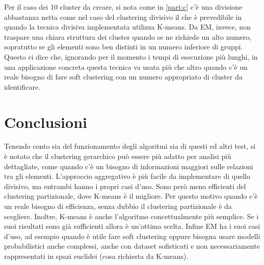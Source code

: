 \documentclass{llncs}
\begin{document}
	Per il caso dei 10 cluster da creare, si nota come in \ref{part:c} c'è una divisione abbastanza netta come nel caso del clustering divisivo il che è prevedibile in quando la tecnica divisiva 
	implementata utilizza K-means. Da EM, invece, non traspare una chiara struttura dei cluster quando se ne richiede un alto numero, sopratutto se gli elementi sono ben distinti in un numero inferiore di gruppi.
	Questo ci dice che, ignorando per il momento i tempi di esecuzione più lunghi, in una applicazione concreta questa tecnica va usata più che altro quando c'è un reale bisogno di fare soft clustering
	con un numero appropriato di cluster da identificare.  

	\section{Conclusioni}
	Tenendo conto sia del funzionamento degli algoritmi sia di questi ed altri test, si è notato che il clustering gerarchico può essere più adatto per analisi più dettagliate, come quando c'è un
	bisogno di informazioni maggiori sulle relazioni tra gli elementi. L'approccio aggregativo è più facile da implementare di quello divisivo, ma entrambi hanno i propri casi d'uso. Sono però meno
	efficienti del clustering partizionale, dove K-means è il migliore. Per questo motivo quando c'è un reale bisogno di efficienza, senza dubbio il clustering partizionale è da scegliere. Inoltre,
	K-means è anche l'algoritmo concettualmente più semplice. Se i suoi risultati sono già sufficienti allora è un'ottima scelta. Infine EM ha i suoi casi d'uso, ad esempio quando è utile
	fare soft clustering oppure bisogna usare modelli probabilistici anche complessi, anche con dataset sofisticati e non necessariamente rappresentati in spazi euclidei 
	(cosa richiesta da K-means).
\end{document}
